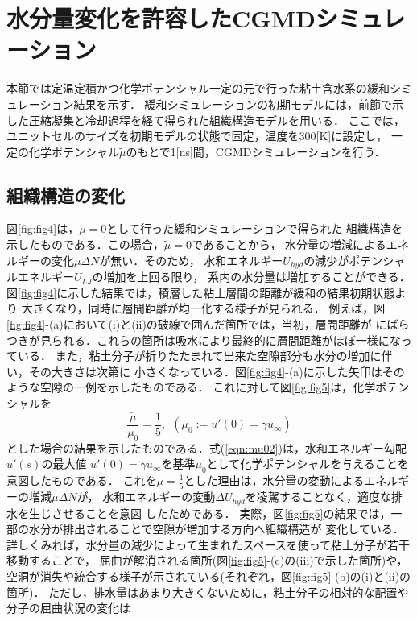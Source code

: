 \section{水分量変化を許容したCGMDシミュレーション}
本節では定温定積かつ化学ポテンシャル一定の元で行った粘土含水系の緩和シミュレーション結果を示す．
緩和シミュレーションの初期モデルには，前節で示した圧縮凝集と冷却過程を経て得られた組織構造モデルを用いる．
ここでは，ユニットセルのサイズを初期モデルの状態で固定，温度を300[K]に設定し，
一定の化学ポテンシャル$\tilde \mu$のもとで1[ns]間，CGMDシミュレーションを行う．
\subsection{組織構造の変化}
図\ref{fig:fig4}は，$\tilde \mu=0$として行った緩和シミュレーションで得られた
組織構造を示したものである．この場合，$\tilde \mu=0$であることから，
水分量の増減によるエネルギーの変化$\mu \Delta N$が無い．そのため，
水和エネルギー$U_{hyd}$の減少がポテンシャルエネルギー$U_{LJ}$の増加を上回る限り，
系内の水分量は増加することができる．
図\ref{fig:fig4}に示した結果では，積層した粘土層間の距離が緩和の結果初期状態より
大きくなり，同時に層間距離が均一化する様子が見られる．
例えば，図\ref{fig:fig4}-(a)において(i)と(ii)の破線で囲んだ箇所では，当初，層間距離が
にばらつきが見られる．これらの箇所は吸水により最終的に層間距離がほぼ一様になっている．
また，粘土分子が折りたたまれて出来た空隙部分も水分の増加に伴い，その大きさは次第に
小さくなっている．図\ref{fig:fig4}-(a)に示した矢印はそのような空隙の一例を示したものである．
%
これに対して図\ref{fig:fig5}は，化学ポテンシャルを
\begin{equation}
	\frac{\tilde \mu}{\mu _0}= \frac{1}{5}
	, \ \ 
	\left( 
		\mu_0:=u'(0)=\gamma u_\infty
	\right)
	\label{eqn:mu02}
\end{equation}
とした場合の結果を示したものである．式(\ref{eqn:mu02})は，水和エネルギー勾配$u'(s)$の最大値
$u'(0)=\gamma u_{\infty}$を基準$\mu_0$として化学ポテンシャルを与えることを意図したものである．
これを$\mu=\frac{1}{5}$とした理由は，水分量の変動によるエネルギーの増減$\mu \Delta N$が，
水和エネルギーの変動$\Delta U_{hyd}$を凌駕することなく，適度な排水を生じさせることを意図
したためである．
実際，図\ref{fig:fig5}の結果では，一部の水分が排出されることで空隙が増加する方向へ組織構造が
変化している．詳しくみれば，水分量の減少によって生まれたスペースを使って粘土分子が若干移動することで，
屈曲が解消される箇所(図\ref{fig:fig5}-(c)の(iii)で示した箇所)や，
空洞が消失や統合する様子が示されている(それぞれ，図\ref{fig:fig5}-(b)の(i)と(ii)の箇所)．
ただし，排水量はあまり大きくないために，粘土分子の相対的な配置や分子の屈曲状況の変化は
